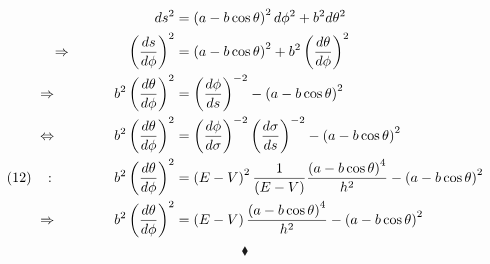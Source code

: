 \begin{align}
ds^2&=\left(a-b\cos \theta \right)^2 d{\phi}^2+b^2 d\theta^2\\
\Rightarrow\quad\quad\quad\quad \left(\dv{s}{\phi}\right)^2 &= \left(a-b\cos \theta \right)^2 +b^2 \left(\dv{\theta}{\phi}\right)^2\\
\Rightarrow\quad\quad\quad\quad b^2 \left(\dv{\theta}{\phi}\right)^2 &= \left(\dv{\phi}{s}\right)^{-2 }- \left(a-b\cos \theta \right)^2 \\
\Leftrightarrow\quad\quad\quad\quad b^2 \left(\dv{\theta}{\phi}\right)^2 &= \left(\dv{\phi}{\sigma}\right)^{-2 }\left(\dv{\sigma}{s}\right)^{-2 }- \left(a-b\cos \theta \right)^2 \\
\left(12\right)\quad \text{: }\quad\quad\quad\quad b^2 \left(\dv{\theta}{\phi}\right)^2 &= \left( E-V \right)^2\frac{1}{\left(E-V\right)}\frac{\left(a-b\cos \theta \right)^4}{h^2}- \left(a-b\cos \theta \right)^2\\
\Rightarrow\quad\quad\quad\quad b^2 \left(\dv{\theta}{\phi}\right)^2 &= \left( E-V \right)\frac{\left(a-b\cos \theta \right)^4}{h^2}- \left(a-b\cos \theta \right)^2
\end{align}
$$\blacklozenge$$
\newpage



